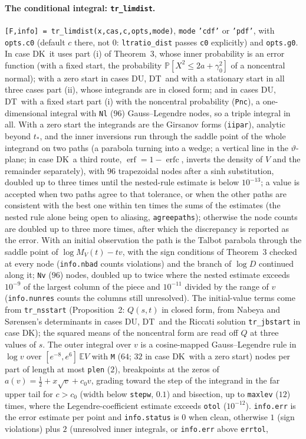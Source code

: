 \documentclass[11pt]{article}
\newcommand{\code}[1]{\texttt{#1}}
\newcommand{\E}{{\mathbb E}}
\newcommand{\PP}{{\mathbb P}}
\newcommand{\Fk}{\textsf{DK}}
\newcommand{\Fu}{\textsf{DU}}
\newcommand{\Ft}{\textsf{DT}}
\begin{document}
\paragraph{The conditional integral: \code{tr\_limdist}.}  \code{[F,info] = tr\_limdist(x,cas,c,opts,mode)}, \code{mode} \code{'cdf'} or \code{'pdf'}, with \code{opts.c0} (default $c$ there, not $0$: \code{ltratio\_dist} passes \code{c0} explicitly) and \code{opts.g0}.  In case \Fk\ it uses part (i) of Theorem~3, whose inner probability is an error function (with a fixed start, the probability $\PP[X^2\le2a+\gamma_0^2]$ of a noncentral normal); with a zero start in cases \Fu, \Ft\ and with a stationary start in all three cases part (ii), whose integrands are in closed form; and in cases \Fu, \Ft\ with a fixed start part (i) with the noncentral probability (\code{Pnc}), a one-dimensional integral with \code{Nl} ($96$) Gauss--Legendre nodes, so a triple integral in all.  With a zero start the integrands are the Girsanov forms (\code{iipar}), analytic beyond $t_*$, and the inner inversions run through the saddle point of the whole integrand on two paths (a parabola turning into a wedge; a vertical line in the $\vartheta$-plane; in case \Fk\ a third route, $\operatorname{erf}=1-\operatorname{erfc}$, inverts the density of $V$ and the remainder separately), with $96$ trapezoidal nodes after a sinh substitution, doubled up to three times until the nested-rule estimate is below $10^{-13}$; a value is accepted when two paths agree to that tolerance, or when the other paths are consistent with the best one within ten times the sums of the estimates (the nested rule alone being open to aliasing, \code{agreepaths}); otherwise the node counts are doubled up to three more times, after which the discrepancy is reported as the error.  With an initial observation the path is the Talbot parabola through the saddle point of $\log M_V(t)-tv$, with the sign conditions of Theorem~3 checked at every node (\code{info.nbad} counts violations) and the branch of $\log D$ continued along it; \code{Nv} ($96$) nodes, doubled up to twice where the nested estimate exceeds $10^{-9}$ of the largest column of the piece and $10^{-11}$ divided by the range of $v$ (\code{info.nunres} counts the columns still unresolved).  The initial-value terms come from \code{tr\_nsstart} (Proposition~2: $Q(s,t)$ in closed form, from Nabeya and S\o rensen's determinants in cases \Fu, \Ft\ and the Riccati solution \code{tr\_jbstart} in case \Fk); the squared means of the noncentral form are read off $Q$ at three values of $s$.  The outer integral over $v$ is a cosine-mapped Gauss--Legendre rule in $\log v$ over $[e^{-8},e^6]\,\E V$ with \code{M} ($64$; $32$ in case \Fk\ with a zero start) nodes per part of length at most \code{plen} ($2$), breakpoints at the zeros of $a(v)=\frac12+x\sqrt v+c_0v$, grading toward the step of the integrand in the far upper tail for $c>c_0$ (width below \code{stepw}, $0.1$) and bisection, up to \code{maxlev} ($12$) times, where the Legendre-coefficient estimate exceeds \code{otol} ($10^{-12}$).  \code{info.err} is the error estimate per point and \code{info.status} is $0$ when clean, otherwise $1$ (sign violations) plus $2$ (unresolved inner integrals, or \code{info.err} above \code{errtol}, 
\end{document}
